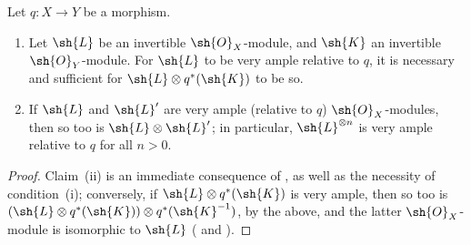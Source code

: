 \begin{corollary}[4.4.9]
\label{II.4.4.9}
Let $q:X\to Y$ be a morphism.
\begin{enumerate}
  \item Let $\sh{L}$ be an invertible $\sh{O}_X$-module, and $\sh{K}$ an invertible $\sh{O}_Y$-module.
    For $\sh{L}$ to be very ample relative to $q$, it is necessary and sufficient for $\sh{L}\otimes q^*(\sh{K})$ to be so.
  \item If $\sh{L}$ and $\sh{L}'$ are very ample (relative to $q$) $\sh{O}_X$-modules, then so too is $\sh{L}\otimes\sh{L}'$;
    in particular, $\sh{L}^{\otimes n}$ is very ample relative to $q$ for all $n>0$.
\end{enumerate}
\end{corollary}

\begin{proof}
Claim~(ii) is an immediate consequence of , as well as the necessity of condition~(i);
conversely, if $\sh{L}\otimes q^*(\sh{K})$ is very ample, then so too is $(\sh{L}\otimes q^*(\sh{K}))\otimes q^*(\sh{K}^{-1})$, by the above, and the latter $\sh{O}_X$-module is isomorphic to $\sh{L}$ ( and ).
\end{proof}

